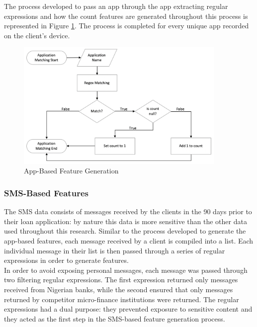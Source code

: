 The process developed to pass an app through the app extracting regular expressions and how the count features are generated throughout this process is represented in Figure \ref{fig:app_features}. The process is completed for every unique app recorded on the client's device. 


\vspace{10 pt}

\begin{figure}[!htb]
\centering
\includegraphics[width=0.9\textwidth]{images/app_feats.png}
\caption{App-Based Feature Generation}
\label{fig:app_features}
\end{figure}

\newpage

\subsubsection{SMS-Based Features}

The SMS data consists of messages received by the clients in the 90 days prior to their loan application: by nature this data is more sensitive than the other data used throughout this research. Similar to the process developed to generate the app-based features, each message received by a client is compiled into a list. Each individual message in their list is then passed through a series of regular expressions in order to generate features.  \\

In order to avoid exposing personal messages, each message was passed through two filtering regular expressions. The first expression returned only messages received from Nigerian banks, while the second ensured that only messages returned by competitor micro-finance institutions were returned. The regular expressions had a dual purpose: they prevented exposure to sensitive content and they acted as the first step in the SMS-based feature generation process. \\

